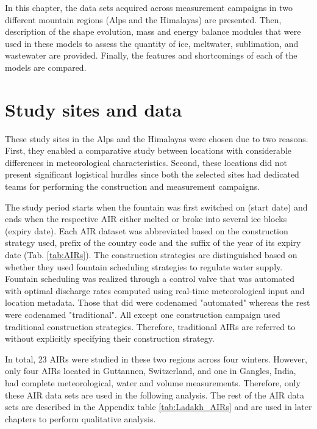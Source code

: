 In this chapter, the data sets acquired across measurement campaigns in two different mountain regions (Alps and
the Himalayas) are presented. Then, description of the shape evolution, mass and energy balance modules that
were used in these models to assess the quantity of ice, meltwater, sublimation, and wastewater are provided.
Finally, the features and shortcomings of each of the models are compared.

\section{Study sites and data}

These study sites in the Alps and the Himalayas were chosen due to two reasons. First, they enabled a
comparative study between locations with considerable differences in meteorological characteristics. Second,
these locations did not present significant logistical hurdles  since both the selected sites had dedicated
teams for performing the construction and measurement campaigns.

The study period starts when the fountain was first switched on (start date) and ends when the respective AIR
either melted or broke into several ice blocks (expiry date).  Each AIR dataset was abbreviated based on the
construction strategy used, prefix of the country code and the suffix of the year of its expiry date
(Tab. \ref{tab:AIRs}). The construction strategies are distinguished based on whether they used fountain scheduling
strategies to regulate water supply. Fountain scheduling was realized through a control valve that was automated
with optimal discharge rates computed using real-time meteorological input and location metadata. Those that did were
codenamed "automated" whereas the rest were codenamed "traditional". All except one construction campaign used
traditional construction strategies. Therefore, traditional \ac{AIRs} are referred to without explicitly
specifying their construction strategy.

In total, 23 \ac{AIRs} were studied in these two regions across four winters.  However, only four \ac{AIRs} located in
Guttannen, Switzerland, and one in Gangles, India, had complete meteorological, water and volume measurements. Therefore,
only these AIR data sets are used in the following analysis. The rest of the AIR data sets are described in the
Appendix table \ref{tab:Ladakh_AIRs} and are used in later chapters to perform qualitative analysis.

